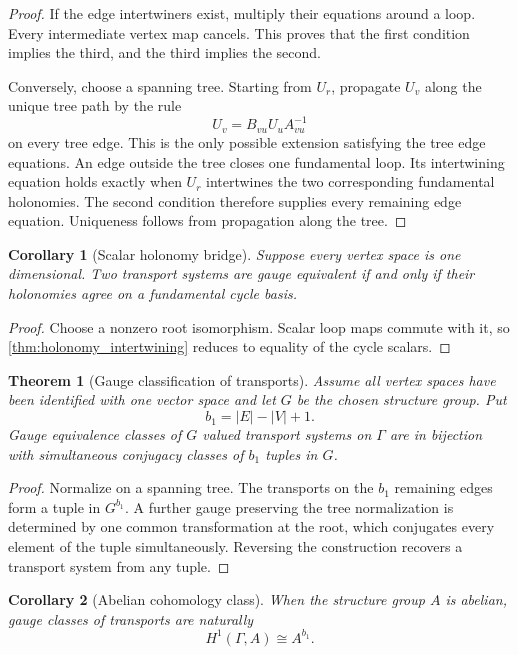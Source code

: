 \documentclass{aomart}
\newtheorem{theorem}{Theorem}[section]
\newtheorem{corollary}[corollary]{Corollary}
\theoremstyle{definition}
\theoremstyle{remark}
\begin{document}
\begin{proof}
If the edge intertwiners exist, multiply their equations around a loop.  Every intermediate vertex map cancels.  This proves that the first condition implies the third, and the third implies the second.

Conversely, choose a spanning tree.  Starting from $U_r$, propagate $U_v$ along the unique tree path by the rule
\[
U_v=B_{vu}U_uA_{vu}^{-1}
\]
on every tree edge.  This is the only possible extension satisfying the tree edge equations.  An edge outside the tree closes one fundamental loop.  Its intertwining equation holds exactly when $U_r$ intertwines the two corresponding fundamental holonomies.  The second condition therefore supplies every remaining edge equation.  Uniqueness follows from propagation along the tree.
\end{proof}

\begin{corollary}[Scalar holonomy bridge]\label{cor:scalar_holonomy_bridge}
Suppose every vertex space is one dimensional.  Two transport systems are gauge equivalent if and only if their holonomies agree on a fundamental cycle basis.
\end{corollary}

\begin{proof}
Choose a nonzero root isomorphism.  Scalar loop maps commute with it, so \cref{thm:holonomy_intertwining} reduces to equality of the cycle scalars.
\end{proof}

\begin{theorem}[Gauge classification of transports]\label{thm:gauge_classification}
Assume all vertex spaces have been identified with one vector space and let $G$ be the chosen structure group.  Put
\[
b_1=|E|-|V|+1.
\]
Gauge equivalence classes of $G$ valued transport systems on $\Gamma$ are in bijection with simultaneous conjugacy classes of $b_1$ tuples in $G$.
\end{theorem}

\begin{proof}
Normalize on a spanning tree.  The transports on the $b_1$ remaining edges form a tuple in $G^{b_1}$.  A further gauge preserving the tree normalization is determined by one common transformation at the root, which conjugates every element of the tuple simultaneously.  Reversing the construction recovers a transport system from any tuple.
\end{proof}

\begin{corollary}[Abelian cohomology class]\label{cor:abelian_holonomy_class}
When the structure group $A$ is abelian, gauge classes of transports are naturally
\[
H^1(\Gamma,A)
\cong
A^{b_1}.
\]
\end{corollary}
\end{document}
